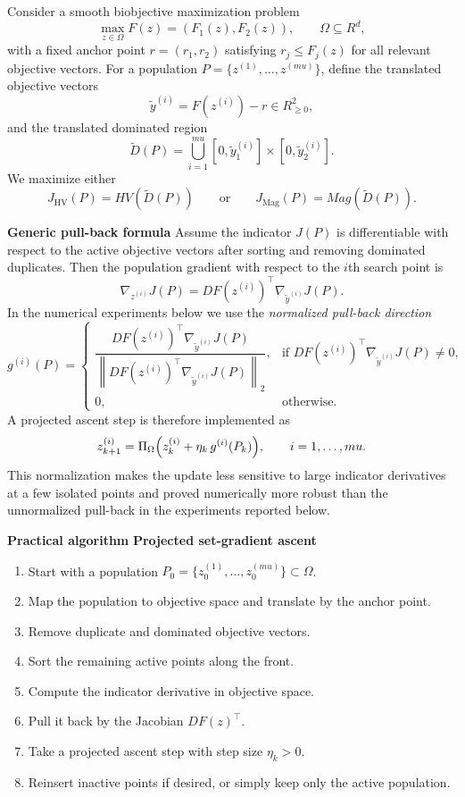 \documentclass{article}
\def\mu{mu}%
\def\HV{HV}%
\def\Mag{Mag}%
\def\R{R}%
\theoremstyle{definition}
\newcommand{\Mag}{\operatorname{Mag}}
\newcommand{\HV}{\operatorname{HV}}
\newcommand{\R}{\mathbb{R}}
\newcommand{\1}{\mathbf{1}}
\newcommand{\myparagraph}[1]{\medskip\noindent\textbf{#1}}
\begin{document}
Consider a smooth biobjective maximization problem
\[
\max_{z\in\Omega} F(z)=(F_1(z),F_2(z)),
\qquad \Omega\subseteq \R^d,
\]
with a fixed anchor point $r=(r_1,r_2)$ satisfying $r_j\le F_j(z)$ for all relevant objective vectors. For a population $P=\{z^{(1)},\dots,z^{(\mu)}\}$, define the translated objective vectors
\[
\widetilde y^{(i)}=F(z^{(i)})-r
\in \R_{\ge 0}^2,
\]
and the translated dominated region
\[
\widetilde D(P)=\bigcup_{i=1}^{\mu}[0,\widetilde y_1^{(i)}]\times[0,\widetilde y_2^{(i)}].
\]
We maximize either
\[
J_{\mathrm{HV}}(P)=\HV(\widetilde D(P))
\qquad\text{or}\qquad
J_{\mathrm{Mag}}(P)=\Mag(\widetilde D(P)).
\]

\myparagraph{Generic pull-back formula}
Assume the indicator $J(P)$ is differentiable with respect to the active objective vectors after sorting and removing dominated duplicates. Then the population gradient with respect to the $i$th search point is
\[
\nabla_{z^{(i)}} J(P)=D F(z^{(i)})^\top \nabla_{\widetilde y^{(i)}} J(P).
\]
In the numerical experiments below we use the \emph{normalized pull-back direction}
\[
g^{(i)}(P)=
\begin{cases}
\dfrac{D F(z^{(i)})^\top \nabla_{\widetilde y^{(i)}} J(P)}{\left\|D F(z^{(i)})^\top \nabla_{\widetilde y^{(i)}} J(P)\right\|_2}, & \text{if } D F(z^{(i)})^\top \nabla_{\widetilde y^{(i)}} J(P)\neq 0,\\[1.0ex]
0, & \text{otherwise.}
\end{cases}
\]
A projected ascent step is therefore implemented as
\[
z_{k+1}^{(i)}=\Pi_{\Omega}\Bigl(z_k^{(i)}+\eta_k \, g^{(i)}(P_k)\Bigr),
\qquad i=1,\dots,\mu.
\]
This normalization makes the update less sensitive to large indicator derivatives at a few isolated points and proved numerically more robust than the unnormalized pull-back in the experiments reported below.

\myparagraph{Practical algorithm}
\myparagraph{Projected set-gradient ascent}
\begin{enumerate}[label=\arabic*.]
    \item Start with a population $P_0=\{z_0^{(1)},\dots,z_0^{(\mu)}\}\subset\Omega$.
    \item Map the population to objective space and translate by the anchor point.
    \item Remove duplicate and dominated objective vectors.
    \item Sort the remaining active points along the front.
    \item Compute the indicator derivative in objective space.
    \item Pull it back by the Jacobian $DF(z)^\top$.
    \item Take a projected ascent step with step size $\eta_k>0$.
    \item Reinsert inactive points if desired, or simply keep only the active population.
\end{enumerate}
\end{document}
